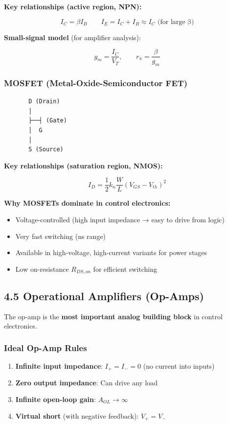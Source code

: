 \documentclass[11pt,a4paper]{book}
\begin{document}
\textbf{Key relationships (active region, NPN):}

\[I_C = \beta I_B \qquad I_E = I_C + I_B \approx I_C \text{ (for large β)}\]

\textbf{Small-signal model} (for amplifier analysis):

\[g_m = \frac{I_C}{V_T}, \qquad r_\pi = \frac{\beta}{g_m}\]

\subsubsection{MOSFET (Metal-Oxide-Semiconductor FET)}

\begin{lstlisting}
       D (Drain)
       │
       ├──┤ (Gate)
       │  G
       │
       S (Source)
\end{lstlisting}

\textbf{Key relationships (saturation region, NMOS):}

\[I_D = \frac{1}{2} k_n \frac{W}{L} (V_{GS} - V_{th})^2\]

\textbf{Why MOSFETs dominate in control electronics:}
\begin{itemize}
\item Voltage-controlled (high input impedance → easy to drive from logic)
\item Very fast switching (ns range)
\item Available in high-voltage, high-current variants for power stages
\item Low on-resistance $R_{DS,on}$ for efficient switching
\end{itemize}

\medskip\noindent\hrulefill\medskip

\subsection{4.5 Operational Amplifiers (Op-Amps)}

The op-amp is the \textbf{most important analog building block} in control electronics.

\subsubsection{Ideal Op-Amp Rules}

\begin{enumerate}
\item \textbf{Infinite input impedance}: $I_+ = I_- = 0$ (no current into inputs)
\item \textbf{Zero output impedance}: Can drive any load
\item \textbf{Infinite open-loop gain}: $A_{OL} \to \infty$
\item \textbf{Virtual short} (with negative feedback): $V_+ = V_-$
\end{enumerate}
\end{document}
